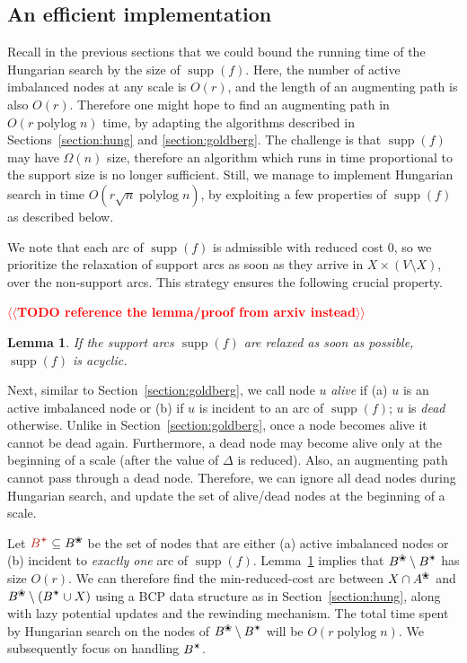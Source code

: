 \documentclass[11pt]{article}
\makeatletter
\def\polylog{\mathop{\mathrm{polylog}}}
\def\supp{\operatorname{supp}}
\def\alive#1{{#1}^\text{\ding{96}}}
\def\star{\text{\ding{84}}}
\newtheorem{lemma}{Lemma}[section]
\numberwithin{figure}{section}
\def\EMPH#1{\textcolor{BrickRed}{{\emph{#1}}}}
\def\n@te#1{\textsf{\boldmath \textbf{$\langle\!\langle$#1$\rangle\!\rangle$}}\leavevmode}
\def\note#1{\textcolor{red}{\n@te{#1}}}
\makeatother
\begin{document}
\subsection{An efficient implementation}

Recall in the previous sections that we could bound the running time of the
Hungarian search by the size of $\supp(f)$.
Here, the number of active imbalanced nodes at any scale is $O(r)$, and the
length of an augmenting path is also $O(r)$.
Therefore one might hope to find an augmenting path in $O(r\polylog n)$ time,
by adapting the algorithms described in Sections~\ref{section:hung} and
\ref{section:goldberg}.
The challenge is that $\supp(f)$ may have $\Omega(n)$ size,
therefore an algorithm which runs in time proportional to the support size is no longer
sufficient.
Still, we manage to implement Hungarian search in time $O(r\sqrt{n}\polylog n)$,
by exploiting a few properties of $\supp(f)$ as described below.

We note that each arc of $\supp(f)$ is admissible with reduced cost $0$,
so we prioritize the relaxation of support arcs as soon as they arrive in
$X \times (V \setminus X)$, over the non-support arcs.
This strategy ensures the following crucial property.

\note{TODO reference the lemma/proof from arxiv instead} %
\begin{lemma}
\label{lemma:supp_acyclic}
If the support arcs $\supp(f)$ are relaxed as soon as possible, $\supp(f)$ is acyclic.
\end{lemma}

Next, similar to Section~\ref{section:goldberg}, we call node $u$
\EMPH{alive} if (a) $u$ is an active imbalanced node or (b) if $u$ is incident to
an arc of $\supp(f)$; $u$ is \EMPH{dead} otherwise.
Unlike in Section~\ref{section:goldberg}, once a node becomes alive it cannot
be dead again.
Furthermore, a dead node may become alive only at the beginning of a scale
(after the value of $\Delta$ is reduced).
Also, an augmenting path cannot pass through a dead node.
Therefore, we can ignore all dead nodes during Hungarian search,
and update the set of alive/dead nodes at the beginning of a scale.

Let $\EMPH{$B^\star$} \subseteq \alive{B}$ be the set of nodes that are either (a) active
imbalanced nodes or (b) incident to \emph{exactly one} arc of $\supp(f)$.
Lemma~\ref{lemma:supp_acyclic} implies that $\alive{B} \setminus B^\star$ has size $O(r)$.
%
We can therefore find the min-reduced-cost arc between $X \cap \alive{A}$ and $\alive{B} \setminus (B^\star \cup X)$
using a BCP data structure as in Section~\ref{section:hung}, along with lazy
potential updates and the rewinding mechanism.
The total time spent by Hungarian search on the nodes of $\alive{B} \setminus B^\star$ will be $O(r\polylog n)$.
We subsequently focus on handling $B^\star$.
\end{document}
